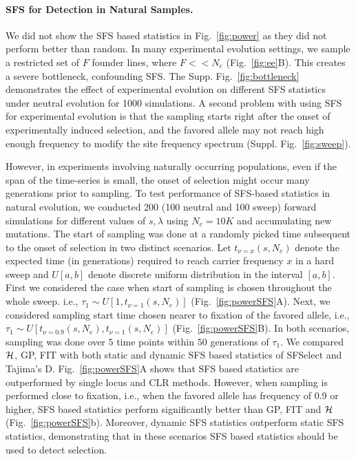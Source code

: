 \documentclass[11pt]{article}
\begin{document}
\paragraph{SFS for Detection in Natural Samples.} We did not show the
SFS based statistics in Fig.~\ref{fig:power} as they did not perform
better than random. In many experimental evolution settings, we sample
a restricted set of $F$ founder lines, where $F<<N_e$
(Fig.~\ref{fig:ee}B). This creates a severe bottleneck, confounding
SFS. The Supp. Fig.~\ref{fig:bottleneck} demonstrates the effect of
experimental evolution on different SFS statistics under neutral
evolution for 1000 simulations. A second problem with using SFS for
experimental evolution is that the sampling starts right after the
onset of experimentally induced selection, and the favored allele may
not reach high enough frequency to modify the site frequency spectrum
(Suppl. Fig.~\ref{fig:sweep}).

However, in experiments involving naturally occurring populations,
even if the span of the time-series is small, the onset of selection
might occur many generations prior to sampling. To test performance of
SFS-based statistics in natural evolution, we conducted 200 (100
neutral and 100 sweep) forward simulations for different values of
$s,\lambda$ using $N_e=10K$ and accumulating new mutations. The start
of sampling was done at a randomly picked time subsequent to the onset
of selection in two distinct scenarios. Let $t_{\nu=x}(s,N_e)$ denote
the expected time (in generations) required to reach carrier frequency
$x$ in a hard sweep and $U[a,b]$ denote discrete uniform distribution
in the interval $[a,b]$. First we considered the case when start of
sampling is chosen throughout the whole sweep. i.e., $\tau_1 \sim
U\left[1,t_{\nu=1}(s,N_e)\right]$
(Fig.~\ref{fig:powerSFS}A). Next, we considered sampling start time
  chosen nearer to fixation of the favored allele, i.e., $\tau_1 \sim
  U\left[t_{\nu=0.9}(s,N_e),t_{\nu=1}(s,N_e)\right]$
  (Fig.~\ref{fig:powerSFS}B). In both scenarios, sampling was done
  over $5$ time points within $50$ generations of $\tau_1$. We
  compared ${\cal H}$, GP, FIT with both static and dynamic SFS based
  statistics of SFSelect and Tajima's D. Fig.~\ref{fig:powerSFS}A
  shows that SFS based statistics are outperformed by single locus and
  CLR methods. However, when sampling is performed close to fixation,
  i.e., when the favored allele has frequency of 0.9 or higher, SFS
  based statistics perform significantly better than GP, FIT and ${\cal H}$
  (Fig.~\ref{fig:powerSFS}b). Moreover, dynamic SFS statistics
  outperform static SFS statistics, demonstrating that in these
  scenarios SFS based statistics should be used to detect selection.
\end{document}
